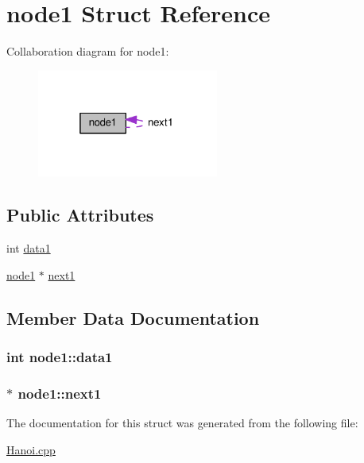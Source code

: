\hypertarget{structnode1}{}\section{node1 Struct Reference}
\label{structnode1}


Collaboration diagram for node1\+:
\nopagebreak
\begin{figure}[H]
\begin{center}
\leavevmode
\includegraphics[width=169pt]{structnode1__coll__graph}
\end{center}
\end{figure}
\subsection*{Public Attributes}
\begin{DoxyCompactItemize}
\item 
int \hyperlink{structnode1_a3b6a50ecb2a2883e7a0a364ce108d2ad}{data1}
\item 
\hyperlink{structnode1}{node1} $\ast$ \hyperlink{structnode1_a91021c80c43acf0a49ffec9b73bf46ad}{next1}
\end{DoxyCompactItemize}


\subsection{Member Data Documentation}
\subsubsection[{\texorpdfstring{data1}{data1}}]{\setlength{\rightskip}{0pt plus 5cm}int node1\+::data1}\hypertarget{structnode1_a3b6a50ecb2a2883e7a0a364ce108d2ad}{}\label{structnode1_a3b6a50ecb2a2883e7a0a364ce108d2ad}
\subsubsection[{\texorpdfstring{next1}{next1}}]{$\ast$ node1\+::next1}\hypertarget{structnode1_a91021c80c43acf0a49ffec9b73bf46ad}{}\label{structnode1_a91021c80c43acf0a49ffec9b73bf46ad}


The documentation for this struct was generated from the following file\+:\begin{DoxyCompactItemize}
\item 
\hyperlink{Hanoi_8cpp}{Hanoi.\+cpp}\end{DoxyCompactItemize}
